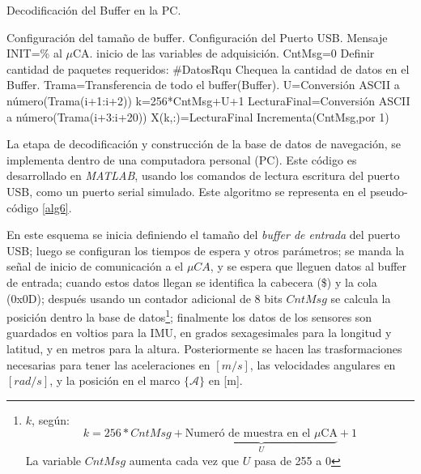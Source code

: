 \documentclass[10pt]{report}
\numberwithin{equation}{chapter}
\numberwithin{algorithm}{chapter}
\newcommand{\marco}[1]{\{\mathcal{#1}\}}
\begin{document}
\begin{algorithm}[ht]
\caption{Decodificación del Buffer en la PC.}
\label{alg6}
\begin{algorithmic}\footnotesize
\State Configuración del tamaño de buffer.
\State Configuración del Puerto USB.
\State Mensaje INIT=\% al $\mu$CA.
\State inicio de las variables de adquisición.
\State CntMsg=0\Comment{\textcolor[gray]{0.6}{Variable de cuenta cada 256 paquetes.}}
\State Definir cantidad de paquetes requeridos: \#DatosRqu
 \Comment{\textcolor[gray]{0.6}{Espera que existan datos el buffer.}}
\State Chequea la cantidad de datos en el Buffer.
\EndWhile
\State Trama=Transferencia de todo el buffer(Buffer).
\State U=Conversión ASCII a número(Trama(i+1:i+2))\Comment{\textcolor[gray]{0.6}{Hace la conversión de ASCII a un valor numérico para el contador de mensaje, y obtener la numeración del paquete.}}
\State k=256*CntMsg+U+1\Comment{\textcolor[gray]{0.6}{Determina la posición del paquete en el vector de información “X”.}}
\State LecturaFinal=Conversión ASCII a número(Trama(i+3:i+20))
\State X(k,:)=LecturaFinal\Comment{\textcolor[gray]{0.6}{Guarda en la posición determinada en k}}
\Comment{\textcolor[gray]{0.6}{Fueron enviados 256}}
\State Incrementa(CntMsg,por 1)
\EndIf
\EndIf
\EndFor
\EndFor
\end{algorithmic}
\end{algorithm}
La etapa de decodificación y construcción de la base de datos de navegación, se implementa dentro de una computadora personal (PC). Este código es desarrollado en \textsl{MATLAB}, usando los comandos de lectura escritura del puerto USB, como un puerto serial simulado. Este algoritmo se representa en el pseudo-código \ref{alg6}.\par
En este esquema se inicia definiendo el tamaño del \emph{buffer de entrada} del puerto USB; luego se configuran los tiempos de espera y otros parámetros; se manda la señal de inicio de comunicación a el $\mu CA$, y se espera que lleguen datos al buffer de entrada; cuando estos datos llegan se identifica la cabecera (\$) y la cola (\textsf{0x0D}); después usando un contador adicional de 8 bits $CntMsg$ se calcula la posición dentro la base de datos\footnote{ $k$, según:
\begin{equation*}
k=256*CntMsg+\underbrace{\text{Numeró de muestra en el $\mu$CA}}_U+1 
\end{equation*}
La variable $CntMsg$ aumenta cada vez que $U$ pasa de 255 a 0};
finalmente los datos de los sensores son guardados en voltios para la IMU, en grados sexagesimales para la longitud y latitud, y en metros para la altura. Posteriormente se hacen las trasformaciones necesarias para tener las aceleraciones en $[m/s]$, las velocidades angulares en $[rad/s]$, y la posición en el marco $\marco{A}$ en [m].
\end{document}
